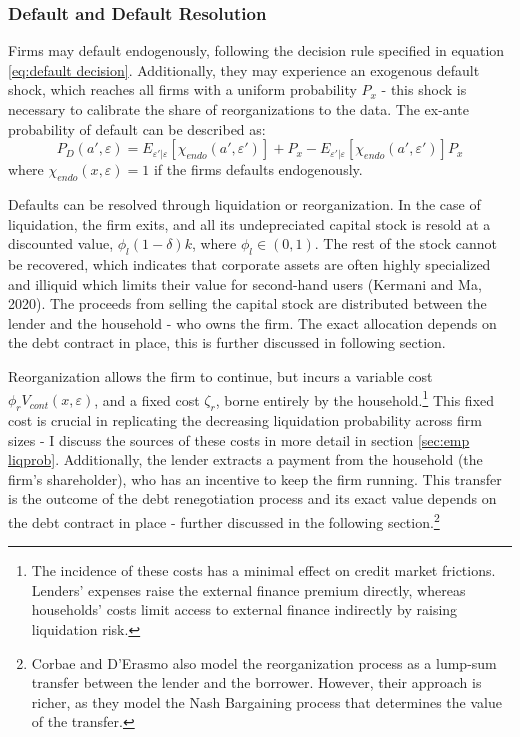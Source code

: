 \documentclass[12pt]{article}
\begin{document}
\subsubsection{Default and Default Resolution} \label{sec:default resolution}
Firms may default endogenously, following the decision rule specified in equation \ref{eq:default decision}. Additionally, they may experience an exogenous default shock, which reaches all firms with a uniform probability $P_{x}$ - this shock is necessary to calibrate the share of reorganizations to the data. The ex-ante probability of default can be described as: 
\begin{equation} \label{eq:default probability}
 P_D(a', \varepsilon) = E_{\varepsilon'|\varepsilon}[\chi_{endo}(a',\varepsilon')] + P_{x} - E_{\varepsilon'|\varepsilon}[\chi_{endo}(a',\varepsilon')]P_{x}
\end{equation}
where $\chi_{endo}(x, \varepsilon) = 1$ if the firms defaults endogenously. 
 
Defaults can be resolved through liquidation or reorganization. In the case of liquidation, the firm exits, and all its undepreciated capital stock is resold at a discounted value, $\phi_l(1-\delta)k$, where $\phi_l \in (0,1)$. The rest of the stock cannot be recovered, which indicates that corporate assets are often highly specialized and illiquid which limits their value for second-hand users (Kermani and Ma, 2020). The proceeds from selling the capital stock are distributed between the lender and the household - who owns the firm. The exact allocation depends on the debt contract in place, this is further discussed in following section. 

Reorganization allows the firm to continue, but incurs a variable cost $\phi_r V_{cont}(x,\varepsilon)$, and a fixed cost $\zeta_r$, borne entirely by the household.\footnote{The incidence of these costs has a minimal effect on credit market frictions. Lenders' expenses raise the external finance premium directly, whereas households' costs limit access to external finance indirectly by raising liquidation risk.} This fixed cost is crucial in replicating the decreasing liquidation probability across firm sizes - I discuss the sources of these costs in more detail in section \ref{sec:emp liqprob}. Additionally, the lender extracts a payment from the household (the firm's shareholder), who has an incentive to keep the firm running. This transfer is the outcome of the debt renegotiation process and its exact value depends on the debt contract in place - further discussed in the following section.\footnote{Corbae and D'Erasmo also model the reorganization process as a lump-sum transfer between the lender and the borrower. However, their approach is richer, as they model the Nash Bargaining process that determines the value of the transfer.} 
\end{document}
